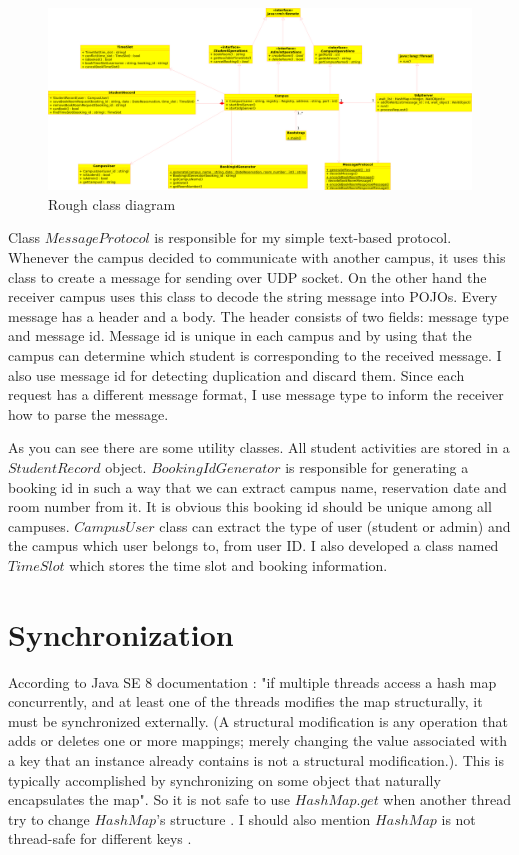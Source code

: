 \documentclass[12pt]{article}
\begin{document}
\begin{figure}
\caption{Rough class diagram}
\centering
\label{fig:class_diagram}
\includegraphics[width=\linewidth]{img/class_diagram.png}
\end{figure}

\par Class $MessageProtocol$ is responsible for my simple text-based protocol. Whenever the campus decided to communicate with another campus, it uses this class to create a message for sending over UDP socket. On the other hand the receiver campus uses this class to decode the string message into POJOs. Every message has a header and a body. The header consists of two fields: message type and message id. Message id is unique in each campus and by using that the campus can determine which student is corresponding to the received message. I also use message id for detecting duplication and discard them. Since each request has a different message format, I use message type to inform the receiver how to parse the message. 
\par As you can see there are some utility classes. All student activities are stored in a $StudentRecord$ object. $BookingIdGenerator$ is responsible for generating a booking id in such a way that we can extract campus name, reservation date and room number from it. It is obvious this booking id should be unique among all campuses. $CampusUser$ class can extract the type of user (student or admin) and the campus which user belongs to, from user ID. I also developed a class named $TimeSlot$ which stores the time slot and booking information.

\section{Synchronization}
According to Java SE 8 documentation \cite{hashmap}: "if multiple threads access a hash map concurrently, and at least one of the threads modifies the map structurally, it must be synchronized externally. (A structural modification is any operation that adds or deletes one or more mappings; merely changing the value associated with a key that an instance already contains is not a structural modification.). This is typically accomplished by synchronizing on some object that naturally encapsulates the map". So it is not safe to use $HashMap.get$ when another thread try to change $HashMap$'s structure \cite{hashmap-multithread-get}. I should also mention $HashMap$ is not thread-safe for different keys \cite{hashmap-multithread-different-keys}.
\end{document}
